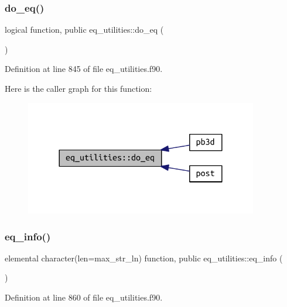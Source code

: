 \subsubsection{\texorpdfstring{do\+\_\+eq()}{do\_eq()}}
{\footnotesize\ttfamily logical function, public eq\+\_\+utilities\+::do\+\_\+eq (\begin{DoxyParamCaption}{ }\end{DoxyParamCaption})}



Definition at line 845 of file eq\+\_\+utilities.\+f90.

Here is the caller graph for this function\+:
\nopagebreak
\begin{figure}[H]
\begin{center}
\leavevmode
\includegraphics[width=288pt]{namespaceeq__utilities_a5109472305101af3a15e8e8717c426fd_icgraph}
\end{center}
\end{figure}
\mbox{\label{namespaceeq__utilities_a34c5ddab45a54a6c738e5e0b8c7d55d6}} 
\subsubsection{\texorpdfstring{eq\+\_\+info()}{eq\_info()}}
{\footnotesize\ttfamily elemental character(len=max\+\_\+str\+\_\+ln) function, public eq\+\_\+utilities\+::eq\+\_\+info (\begin{DoxyParamCaption}{ }\end{DoxyParamCaption})}



Definition at line 860 of file eq\+\_\+utilities.\+f90.

